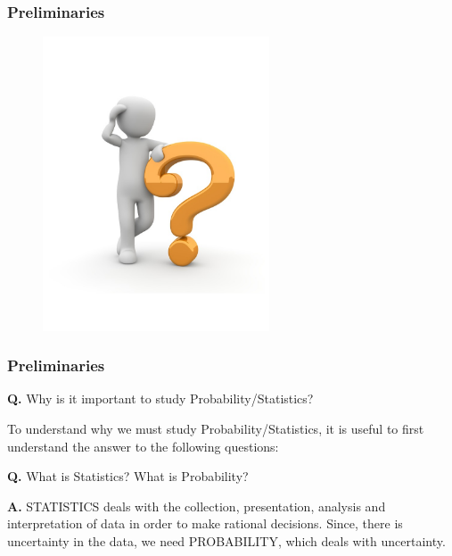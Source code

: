 \documentclass[notes=show,handout]{beamer}
\begin{document}
\begin{frame}
\frametitle{Preliminaries}

\begin{figure}[h!]
\centering               
\includegraphics[width=0.6\textwidth,height=0.7\textheight]{y.pdf}
\end{figure}




\end{frame}




\begin{frame}
\frametitle{Preliminaries}

\color{red} \textbf{Q.} Why is it important to study Probability/Statistics? \color{black}\\
\vspace{0.5cm}

To understand why we must study Probability/Statistics, it is useful to first understand the answer to the following questions:  
\vspace{0.5cm}

\color{red}\textbf{Q.} What is Statistics? What is Probability? \color{black}
\vspace{0.5cm}
 
\textbf{A.} \color{blue} STATISTICS \color{black} deals with the collection, presentation, analysis and interpretation of data in order to make rational decisions. Since, there is uncertainty in the data, we need \color{blue} PROBABILITY\color{black}, which deals with uncertainty.

\end{frame}
\end{document}
